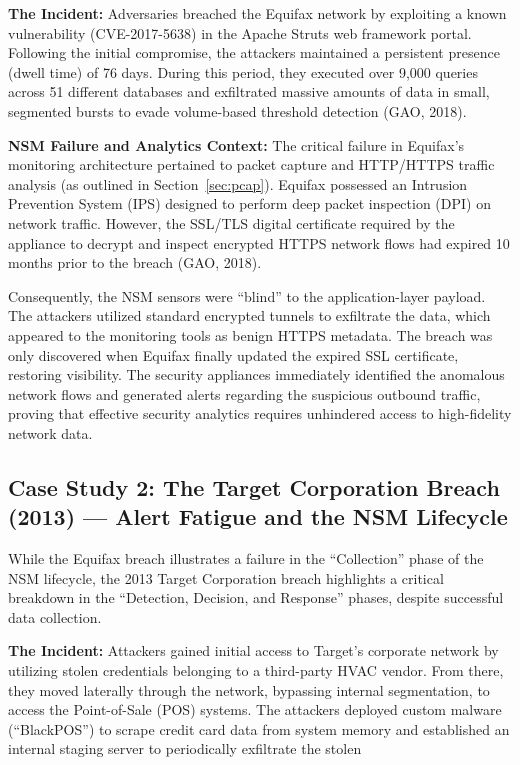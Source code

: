 \textbf{The Incident:} Adversaries breached the Equifax network by exploiting a known vulnerability (CVE-2017-5638) in the Apache Struts web framework portal. Following the initial compromise, the attackers maintained a persistent presence (dwell time) of 76 days. During this period, they executed over 9,000 queries across 51 different databases and exfiltrated massive amounts of data in small, segmented bursts to evade volume-based threshold detection (GAO, 2018).

\textbf{NSM Failure and Analytics Context:} The critical failure in Equifax's monitoring architecture pertained to packet capture and HTTP/HTTPS traffic analysis (as outlined in Section~\ref{sec:pcap}). Equifax possessed an Intrusion Prevention System (IPS) designed to perform deep packet inspection (DPI) on network traffic. However, the SSL/TLS digital certificate required by the appliance to decrypt and inspect encrypted HTTPS network flows had expired 10 months prior to the breach (GAO, 2018).

Consequently, the NSM sensors were ``blind'' to the application-layer payload. The attackers utilized standard encrypted tunnels to exfiltrate the data, which appeared to the monitoring tools as benign HTTPS metadata. The breach was only discovered when Equifax finally updated the expired SSL certificate, restoring visibility. The security appliances immediately identified the anomalous network flows and generated alerts regarding the suspicious outbound traffic, proving that effective security analytics requires unhindered access to high-fidelity network data.

\subsection{Case Study 2: The Target Corporation Breach (2013) --- Alert Fatigue and the NSM Lifecycle}
\label{sec:target}

While the Equifax breach illustrates a failure in the ``Collection'' phase of the NSM lifecycle, the 2013 Target Corporation breach highlights a critical breakdown in the ``Detection, Decision, and Response'' phases, despite successful data collection.

\textbf{The Incident:} Attackers gained initial access to Target's corporate network by utilizing stolen credentials belonging to a third-party HVAC vendor. From there, they moved laterally through the network, bypassing internal segmentation, to access the Point-of-Sale (POS) systems. The attackers deployed custom malware (``BlackPOS'') to scrape credit card data from system memory and established an internal staging server to periodically exfiltrate the stolen
